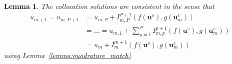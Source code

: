\documentclass{article}
\newtheorem{lemma}{Lemma}
\newcommand{\ve}[1]{\mathbf{#1}}
\begin{document}
\begin{lemma}
The collocation solutions are consistent in the sense that
\begin{align*}
	u_{m+1} = u_{m,P+1} &= u_{m,P} + I_{m,P}^{P+1}\left( f(\ve{u}^{s}) , g(\ve{u}^{e}_m) \right) \\
			&= \ldots = u_{m,1} + \sum_{p=1}^{P} I_{m,p}^{p+1}\left( f(\ve{u}^{s}) , g(\ve{u}^{e}_m) \right) \\
			&= u_{m} + I_{m}^{m+1}\left( f(\ve{u}^{s}) , g(\ve{u}^{e}_m) \right)
\end{align*}
using Lemma~\ref{lemma:quadrature_match}.
\end{lemma}
\end{document}
